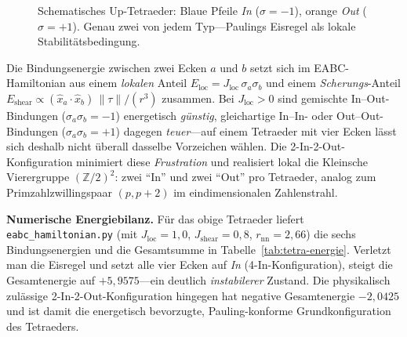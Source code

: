 \documentclass[11pt,a4paper]{article}
\begin{document}
\begin{figure}[htbp]
  \centering
  \caption{Schematisches Up-Tetraeder: Blaue Pfeile \emph{In} ($\sigma=-1$), orange \emph{Out} ($\sigma=+1$). Genau zwei von jedem Typ---Paulings Eisregel als lokale Stabilitätsbedingung.}
\end{figure}

Die Bindungsenergie zwischen zwei Ecken $a$ und $b$ setzt sich im EABC-Hamiltonian aus einem \emph{lokalen} Anteil $E_{\text{loc}} = J_{\text{loc}}\,\sigma_a\sigma_b$ und einem \emph{Scherungs}-Anteil $E_{\text{shear}} \propto (\hat{x}_a \cdot \hat{x}_b)\,\|\tau\|/(r^3)$ zusammen. Bei $J_{\text{loc}}>0$ sind gemischte In--Out-Bindungen ($\sigma_a\sigma_b=-1$) energetisch \emph{günstig}, gleichartige In--In- oder Out--Out-Bindungen ($\sigma_a\sigma_b=+1$) dagegen \emph{teuer}---auf einem Tetraeder mit vier Ecken lässt sich deshalb nicht überall dasselbe Vorzeichen wählen. Die 2-In-2-Out-Konfiguration minimiert diese \emph{Frustration} und realisiert lokal die Kleinsche Vierergruppe $(\mathbb{Z}/2)^2$: zwei ``In'' und zwei ``Out'' pro Tetraeder, analog zum Primzahlzwillingspaar $(p, p+2)$ im eindimensionalen Zahlenstrahl.

\medskip
\noindent\textbf{Numerische Energiebilanz.} Für das obige Tetraeder liefert \texttt{eabc\_hamiltonian.py} (mit $J_{\text{loc}}=1{,}0$, $J_{\text{shear}}=0{,}8$, $r_{\text{nn}}=2{,}66$) die sechs Bindungsenergien und die Gesamtsumme in Tabelle~\ref{tab:tetra-energie}. Verletzt man die Eisregel und setzt alle vier Ecken auf \emph{In} (4-In-Konfiguration), steigt die Gesamtenergie auf $+5{,}9575$---ein deutlich \emph{instabilerer} Zustand. Die physikalisch zulässige 2-In-2-Out-Konfiguration hingegen hat negative Gesamtenergie $-2{,}0425$ und ist damit die energetisch bevorzugte, Pauling-konforme Grundkonfiguration des Tetraeders.
\end{document}
